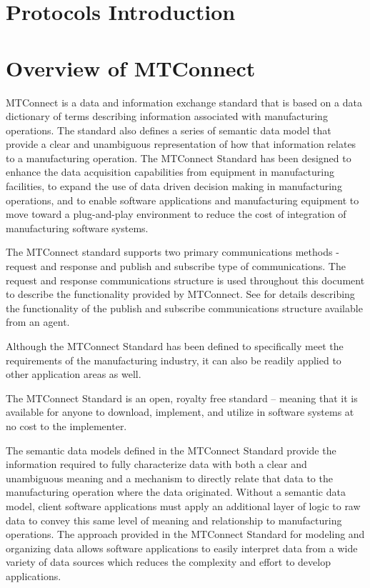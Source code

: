 
\section{Protocols Introduction}
\label{sec:Protocols Introduction}


\section{Overview of MTConnect}
\label{sec:Overview of MTConnect}

MTConnect is a data and information exchange standard that is based on a \gls{data dictionary} of terms describing information associated with manufacturing operations.  The standard also defines a series of \gls{semantic data model} that provide a clear and unambiguous representation of how that information relates to a manufacturing operation.  The MTConnect Standard has been designed to enhance the data acquisition capabilities from equipment in manufacturing facilities, to expand the use of data driven decision making in manufacturing operations, and to enable software applications and manufacturing equipment to move toward a plug-and-play environment to reduce the cost of integration of manufacturing software systems.

The MTConnect standard supports two primary communications methods - \gls{request and response} and \gls{publish and subscribe} type of communications.  The \gls{request and response} communications structure is used throughout this document to describe the functionality provided by MTConnect.  See  for details describing the functionality of the \gls{publish and subscribe} communications structure available from an \gls{agent}. 

Although the MTConnect Standard has been defined to specifically meet the requirements of the manufacturing industry, it can also be readily applied to other application areas as well.

The MTConnect Standard is an open, royalty free standard – meaning that it is available for anyone to download, implement, and utilize in software systems at no cost to the implementer.

The \glspl{semantic data model} defined in the MTConnect Standard provide the information required to fully characterize data with both a clear and unambiguous meaning and a mechanism to directly relate that data to the manufacturing operation where the data originated.  Without a \gls{semantic data model}, client software applications must apply an additional layer of logic to raw data to convey this same level of meaning and relationship to manufacturing operations.  The approach provided in the MTConnect Standard for modeling and organizing data allows software applications to easily interpret data from a wide variety of data sources which reduces the complexity and effort to develop applications.

